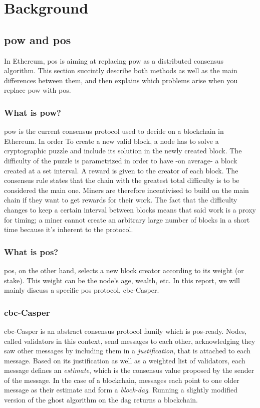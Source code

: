 \chapter{Background}
\label{chap:background}

\section{\gls{pow} and \gls{pos}}
In Ethereum, \gls{pos} is aiming at replacing \gls{pow} as a distributed
consensus algorithm. This section succintly describe both methods as well as the
main differences between them, and then explains which problems arise when you
replace \gls{pow} with \gls{pos}.

\subsection{What is \gls{pow}?}
\gls{pow} is the current consensus protocol used to decide on a blockchain in
Ethereum. In order To create a new valid block, a node has to solve a
cryptographic puzzle and include its solution in the newly created block. The
difficulty of the puzzle is parametrized in order to have -on average- a block
created at a set interval. A reward is given to the creator of each block.  The
consensus rule states that the chain with the greatest total difficulty is to be
considered the main one. Miners are therefore incentivised to build on the main
chain if they want to get rewards for their work. The fact that the difficulty
changes to keep a certain interval between blocks means that said work is a
proxy for timing; a miner cannot create an arbitrary large number of blocks in a
short time because it's inherent to the protocol.


\subsection{What is \gls{pos}?}
\gls{pos}, on the other hand, selects a new block creator according to its
weight (or stake). This weight can be the node's age, wealth, etc. In this
report, we will mainly discuss a specific \gls{pos} protocol, \gls{cbc}-Casper.

\subsection{\gls{cbc}-Casper}
\gls{cbc}-Casper  is an abstract consensus protocol family
which is \gls{pos}-ready. Nodes, called validators in this context, send
messages to each other, acknowledging they saw other messages by including them
in a \textit{justification}, that is attached to each message. Based on its
justification as well as a weighted list of validators, each message defines an
\textit{estimate}, which is the consensus value proposed by the sender of the
message. In the case of a blockchain, messages each point to one older message
as their estimate and form a \textit{block-\gls{dag}}. Running a slightly
modified version of the \gls{ghost} algorithm on the \gls{dag} returns a
blockchain.

